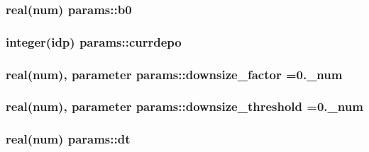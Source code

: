 \subsubsection[{\texorpdfstring{b0}{b0}}]{\setlength{\rightskip}{0pt plus 5cm}real(num) params\+::b0}\hypertarget{namespaceparams_a856909cec83e772b7266d146b4e70d7f}{}\label{namespaceparams_a856909cec83e772b7266d146b4e70d7f}
\subsubsection[{\texorpdfstring{currdepo}{currdepo}}]{\setlength{\rightskip}{0pt plus 5cm}integer(idp) params\+::currdepo}\hypertarget{namespaceparams_af4ccf29a8c1f3a8a47f08f5cbbcd30eb}{}\label{namespaceparams_af4ccf29a8c1f3a8a47f08f5cbbcd30eb}
\subsubsection[{\texorpdfstring{downsize\+\_\+factor}{downsize_factor}}]{\setlength{\rightskip}{0pt plus 5cm}real(num), parameter params\+::downsize\+\_\+factor =0.\+\_\+num}\hypertarget{namespaceparams_a1e70b45a865ed6ef7927e0b49669a567}{}\label{namespaceparams_a1e70b45a865ed6ef7927e0b49669a567}
\subsubsection[{\texorpdfstring{downsize\+\_\+threshold}{downsize_threshold}}]{\setlength{\rightskip}{0pt plus 5cm}real(num), parameter params\+::downsize\+\_\+threshold =0.\+\_\+num}\hypertarget{namespaceparams_aa81c22d18e165451716c4b23ea6fbdb1}{}\label{namespaceparams_aa81c22d18e165451716c4b23ea6fbdb1}
\subsubsection[{\texorpdfstring{dt}{dt}}]{\setlength{\rightskip}{0pt plus 5cm}real(num) params\+::dt}\hypertarget{namespaceparams_aab5b9003ea4155de1cb7c0a3366e0b73}{}\label{namespaceparams_aab5b9003ea4155de1cb7c0a3366e0b73}
